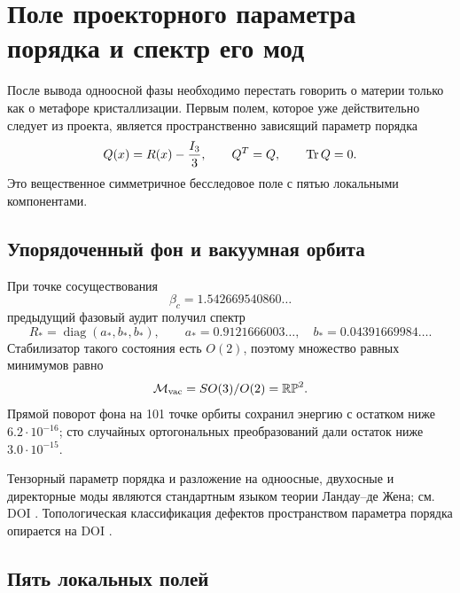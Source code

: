 \chapter{Поле проекторного параметра порядка и спектр его мод}

После вывода одноосной фазы необходимо перестать говорить о материи только
как о метафоре кристаллизации. Первым полем, которое уже действительно
следует из проекта, является пространственно зависящий параметр порядка
\begin{equation}
 Q(x)=R(x)-\frac{I_3}{3},
 \qquad Q^T=Q,
 \qquad \operatorname{Tr} Q=0.
 \label{eq:v6-projective-Q-field}
\end{equation}
Это вещественное симметричное бесследовое поле с пятью локальными
компонентами.

\section{Упорядоченный фон и вакуумная орбита}

При точке сосуществования
\begin{equation}
 \beta_c=1.542669540860\ldots
\end{equation}
предыдущий фазовый аудит получил спектр
\begin{equation}
 R_*=\operatorname{diag}(a_*,b_*,b_*),
 \qquad
 a_*=0.9121666003\ldots,
 \quad
 b_*=0.04391669984\ldots.
 \label{eq:v6-projective-ordered-background}
\end{equation}
Стабилизатор такого состояния есть $O(2)$, поэтому множество равных
минимумов равно
\begin{equation}
 \mathcal M_{\rm vac}=SO(3)/O(2)=\mathbb{RP}^2.
 \label{eq:v6-projective-vacuum-orbit}
\end{equation}
Прямой поворот фона на 101 точке орбиты сохранил энергию с остатком ниже
$6.2\cdot10^{-16}$; сто случайных ортогональных преобразований дали
остаток ниже $3.0\cdot10^{-15}$.

Тензорный параметр порядка и разложение на одноосные, двухосные и
директорные моды являются стандартным языком теории Ландау--де Жена; см.
DOI . Топологическая классификация дефектов
пространством параметра порядка опирается на DOI
.

\section{Пять локальных полей}

